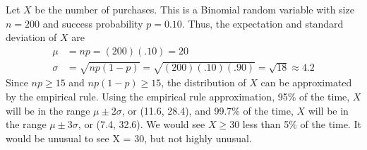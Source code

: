 \documentclass[answers,11pt]{exam}
\begin{document}
\begin{questions}
\begin{solution}
Let $X$ be the number of purchases.  This is a Binomial random variable with
size $n = 200$ and success probability $p = 0.10$.  Thus, the expectation and
standard deviation of $X$ are
\begin{align*}
  \mu &= n p = (200)(.10) = 20 \\
  \sigma &= \sqrt{n p (1 - p)} = \sqrt{(200)(.10)(.90)} = \sqrt{18} \approx 4.2
\end{align*}
Since $n p \geq 15$ and $n p (1 - p) \geq 15$, the distribution of $X$ can be
approximated by the empirical rule.  Using the empirical rule
approximation, 95\% of the time, $X$ will be in
the range $\mu \pm 2 \sigma$, or (11.6, 28.4), and 99.7\% of the time, $X$
will be in the range $\mu \pm 3 \sigma$, or (7.4, 32.6).  We would see $X \geq 30$ less
than 5\% of the time.  It would be unusual to see X = 30, but not highly
unusual.
\end{solution}




\end{questions}
\end{document}
